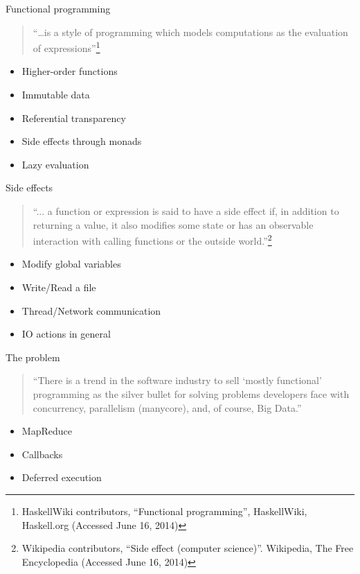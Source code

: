 \documentclass[rail]{beamer}
\begin{document}
\begin{frame}{Functional programming}
  \begin{quote}
    ``\dots is a style of programming which models computations as the
    evaluation of expressions''\footnote[frame,1]
    {HaskellWiki contributors, ``Functional programming'',
      HaskellWiki, Haskell.org (Accessed June 16, 2014)}
  \end{quote}
  \begin{itemize}[<+->]
  \item Higher-order functions
  \item Immutable data
  \item Referential transparency
  \item Side effects through monads
  \item Lazy evaluation
  \end{itemize}
\end{frame}

\begin{frame}{Side effects}
  \begin{quote}
    ``... a function or expression is said to have a side effect if, in
    addition to returning a value, it also modifies some state or has
    an observable interaction with calling functions or the outside
    world.''\footnote[frame,1]
    {Wikipedia contributors, ``Side effect (computer science)''.
      Wikipedia, The Free Encyclopedia (Accessed June 16, 2014)}
  \end{quote}
  \pause
  \begin{itemize}[<+->]
  \item Modify global variables
  \item Write/Read a file
  \item Thread/Network communication
  \item IO actions in general
  \end{itemize}

\end{frame}

\begin{frame}{The problem}
  \begin{quote}
    ``There is a trend in the software industry to sell `mostly
    functional' programming as the silver bullet for solving problems
    developers face with concurrency, parallelism (manycore), and, of
    course, Big Data.''
  \end{quote}
  \pause
  \begin{itemize}
  \item MapReduce
  \item Callbacks
  \item Deferred execution
  \end{itemize}
\end{frame}
\end{document}
